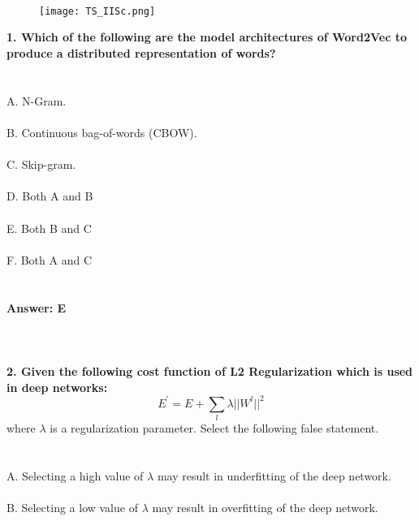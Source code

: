 \documentclass[prl,twocolumn,showpacs,preprintnumbers,superscriptaddress]{revtex4}
\theoremstyle{plain}
\theoremstyle{definition}
\begin{document}
\begin{widetext}
\\
\\
\\

\begin{wrapfigure}
\centering
\end{wrapfigure}
\begin{figure}[h!]
 \begin{right}
  \hfill\texttt{[image: TS\_IISc.png]}
 \end{right}
\end{figure}
\noindent\textbf{1. Which of the following are the model architectures of Word2Vec to produce a distributed representation of words?}
\\
\\
\\
A. N-Gram.
\\
\\
B. Continuous bag-of-words (CBOW).
\\
\\
C. Skip-gram.
\\
\\
D. Both A and B
\\
\\
E. Both B and C
\\
\\
F. Both A and C
\\
\\
\\
\textbf{Answer: E}
\\
\\
\\
\\
\textbf{2. Given the following cost function of L2 Regularization which is used in deep networks:}
\begin{equation}
    E^{\prime} = E + \sum_{l} \lambda ||W^{l}|| ^2 \nonumber{}
\end{equation}
where $\lambda$ is a regularization parameter. Select the following false statement.
\\
\\
\\
\noindent A. Selecting a high value of $\lambda$ may result in underfitting of the deep network.
\\
\\
B. Selecting a low value of $\lambda$ may result in overfitting of the deep network. 
\\
\\

\end{widetext}
\end{document}

